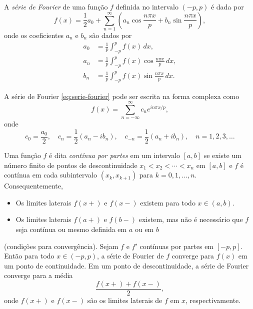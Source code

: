 \documentclass{article}
\begin{document}
\begin{defn}
    A \emph{série de Fourier} de uma função \(f\) definida no intervalo \((-p,p)\) é dada por
    \begin{equation}\label{eq:serie-fourier}
        f(x) = \frac{1}{2}a_0 + \sum_{n=1}^{\infty} \left( a_n \cos\frac{n\pi x}{p} + b_n \sin\frac{n\pi x}{p} \right),
    \end{equation}
    onde os coeficientes \(a_n\) e \(b_n\) são dados por
    \begin{align}
        a_0 &= \frac{1}{p} \int_{-p}^{p} f(x) \, dx, \\
        a_n &= \frac{1}{p} \int_{-p}^{p} f(x) \cos\frac{n\pi x}{p} \, dx, \\
        b_n &= \frac{1}{p} \int_{-p}^{p} f(x) \sin\frac{n\pi x}{p} \, dx.
    \end{align}
\end{defn}

\begin{rem}
    A série de Fourier \eqref{eq:serie-fourier} pode ser escrita na forma complexa como
    \begin{equation}\label{eq:serie-fourier-complexa}
        f(x) = \sum_{n=-\infty}^{\infty} c_n e^{i n \pi x / p},
    \end{equation}
    \noindent onde
    \begin{equation}
        c_0 = \frac{a_0}{2}, \quad c_n = \frac{1}{2}(a_n - i b_n), \quad c_{-n} = \frac{1}{2}(a_n + i b_n), \quad n=1,2,3,\ldots
    \end{equation}
\end{rem}

\begin{defn}
    Uma função \(f\) é dita \emph{contínua por partes} em um intervalo \([a,b]\) se existe um número finito de pontos de descontinuidade \(x_1<x_2<\cdots<x_n\) em \([a,b]\) e \(f\) é contínua em cada subintervalo \((x_k, x_{k+1})\) para \(k=0,1,\ldots,n\). Consequentemente,
    \begin{itemize}
        \item Os limites laterais \(f(x+)\) e \(f(x-)\) existem para todo \(x \in (a,b)\).
        \item Os limites laterais \(f(a+)\) e \(f(b-)\) existem, mas não é necessário que \(f\) seja contínua ou mesmo definida em \(a\) ou em \(b\)
    \end{itemize}
\end{defn}

\begin{thm} (condições para convergência).
    Sejam \(f\) e \(f'\) contínuas por partes em \([-p,p]\). Então para todo \(x \in (-p,p)\), a série de Fourier de \(f\) converge para \(f(x)\) em um ponto de continuidade. Em um ponto de descontinuidade, a série de Fourier converge para a média
    \begin{equation*}
        \frac{f(x+) + f(x-)}{2},
    \end{equation*}
    \noindent onde \(f(x+)\) e \(f(x-)\) são os limites laterais de \(f\) em \(x\), respectivamente.
\end{thm}
\end{document}
